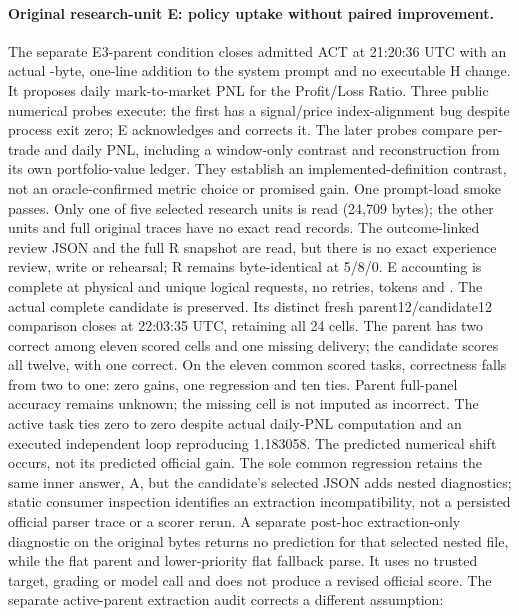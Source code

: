 \paragraph{Original research-unit E: policy uptake without paired improvement.}
The separate E3-parent condition closes admitted ACT at 21:20:36 UTC with an
actual \BacktestWorkerUnitPromptBytes{}-byte, one-line addition to the system
prompt and no executable H change. It proposes daily mark-to-market PNL for
the Profit/Loss Ratio. Three public numerical probes execute: the first has
a signal/price index-alignment bug despite process exit zero; E acknowledges
and corrects it. The later probes compare per-trade and daily PNL, including
a window-only contrast and reconstruction from its own portfolio-value ledger.
They establish an implemented-definition contrast, not an oracle-confirmed
metric choice or promised gain. One prompt-load smoke passes.
Only one of five selected research units is read (24,709 bytes); the other
units and full original traces have no exact read records. The outcome-linked
review JSON and the full R snapshot are read, but there is no exact experience
review, write or rehearsal; R remains byte-identical at 5/8/0.
E accounting is complete at \BacktestWorkerUnitERequests{} physical and
unique logical requests, no retries, \BacktestWorkerUnitETokens{} tokens and
\BacktestWorkerUnitECost{}. The actual complete candidate is preserved.
Its distinct fresh parent12/candidate12 comparison closes at 22:03:35 UTC,
retaining all 24 cells. The parent has two correct among eleven scored cells
and one missing delivery; the candidate scores all twelve, with one correct.
On the eleven common scored tasks, correctness falls from two to one:
zero gains, one regression and ten ties. Parent full-panel accuracy remains
unknown; the missing cell is not imputed as incorrect. The active task ties
zero to zero despite actual daily-PNL computation and an executed independent
loop reproducing 1.183058. The predicted numerical shift occurs, not its
predicted official gain. The sole common regression retains the same inner
answer, A, but the candidate's selected JSON adds nested diagnostics; static
consumer inspection identifies an extraction incompatibility, not a persisted
official parser trace or a scorer rerun.
A separate post-hoc extraction-only diagnostic on the original bytes returns
no prediction for that selected nested file, while the flat parent and
lower-priority flat fallback parse. It uses no trusted target, grading or
model call and does not produce a revised official score.
The separate active-parent extraction audit corrects a different assumption:
